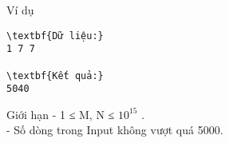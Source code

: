 Ví dụ  
\begin{verbatim}
\textbf{Dữ liệu:}
1 7 7

\textbf{Kết quả:}
5040
\end{verbatim}
   Giới hạn  
- 1 ≤ M, N ≤ $10^{15}$   .   
\\   - Số dòng trong Input không vượt quá 5000.